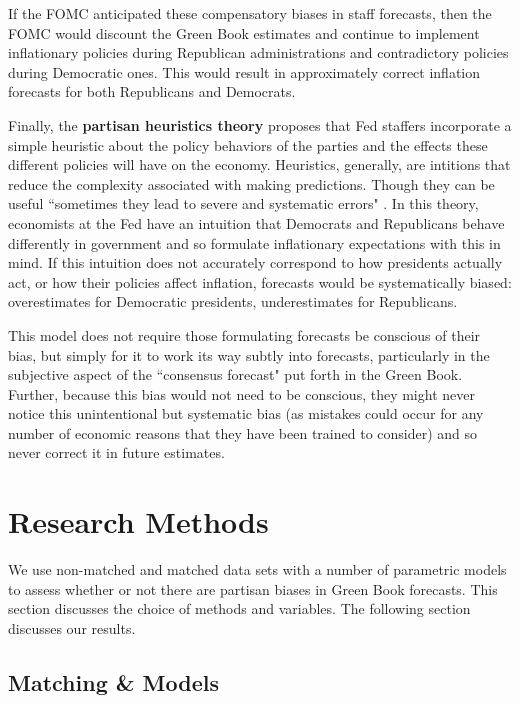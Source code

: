 \documentclass[a4paper]{article}\usepackage{graphicx, color}
\begin{document}
If the FOMC anticipated these compensatory biases in staff forecasts, then the FOMC would discount the Green Book estimates and continue to implement inflationary policies during Republican administrations and contradictory policies during Democratic ones. This would result in approximately correct inflation forecasts for both Republicans and Democrats.

Finally, the {\bf{partisan heuristics theory}} proposes that Fed staffers incorporate a simple heuristic \citep[see][]{tverskykahneman1974, kahneman2003} about the policy behaviors of the parties and the effects these different policies will have on the economy. Heuristics, generally, are intitions that reduce the complexity associated with making predictions. Though they can be useful ``sometimes they lead to severe and systematic errors" \citep[][1124]{tverskykahneman1974}. In this theory, economists at the Fed have an intuition that Democrats and Republicans behave differently in government and so formulate inflationary expectations with this in mind. If this intuition does not accurately correspond to how presidents actually act, or how their policies affect inflation, forecasts would be systematically biased: overestimates for Democratic presidents, underestimates for Republicans. 

This model does not require those formulating forecasts be conscious of their bias, but simply for it to work its way subtly into forecasts, particularly in the subjective aspect of the ``consensus forecast" put forth in the Green Book. Further, because this bias would not need to be conscious, they might never notice this unintentional but systematic bias (as mistakes could occur for any number of economic reasons that they have been trained to consider) and so never correct it in future estimates.



\section{Research Methods}

We use non-matched and matched data sets with a number of parametric models \citep[see][]{Ho2007} to assess whether or not there are partisan biases in Green Book forecasts. This section discusses the choice of methods and variables. The following section discusses our results.

\subsection{Matching \& Models}
\end{document}
